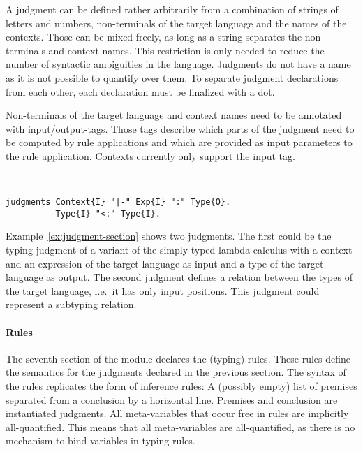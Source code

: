 A judgment can be defined rather arbitrarily from a combination of
strings of letters and numbers, non-terminals of the target language
and the names of the contexts. Those can be mixed freely, as long as a
string separates the non-terminals and context names. This restriction
is only needed to reduce the number of syntactic ambiguities in the
language. Judgments do not have a name as it is not possible to
quantify over them. To separate judgment declarations from each other,
each declaration must be finalized with a dot.

Non-terminals of the target language and context names need to be
annotated with input/output-tags. Those tags describe which parts of
the judgment need to be computed by rule applications and which are
provided as input parameters to the rule application. Contexts
currently only support the input tag.

\begin{example}{~}
\begin{lstlisting}[language=sltc]
judgments Context{I} "|-" Exp{I} ":" Type{O}.
          Type{I} "<:" Type{I}.
\end{lstlisting}
\label{ex:judgment-section}
\end{example}

Example~\ref{ex:judgment-section} shows two judgments. The first could
be the typing judgment of a variant of the simply typed lambda
calculus with a context and an expression of the target language as
input and a type of the target language as output. The second judgment
defines a relation between the types of the target language, i.e.\ it
has only input positions. This judgment could represent a subtyping
relation.

\paragraph{Rules} The seventh section of the module declares the
(typing) rules. These rules define the semantics for the judgments
declared in the previous section. The syntax of the rules replicates
the form of inference rules: A (possibly empty) list of premises
separated from a conclusion by a horizontal line. Premises and
conclusion are instantiated judgments. All meta-variables that occur
free in rules are implicitly all-quantified. This means that all
meta-variables are all-quantified, as there is no mechanism to bind
variables in typing rules.


